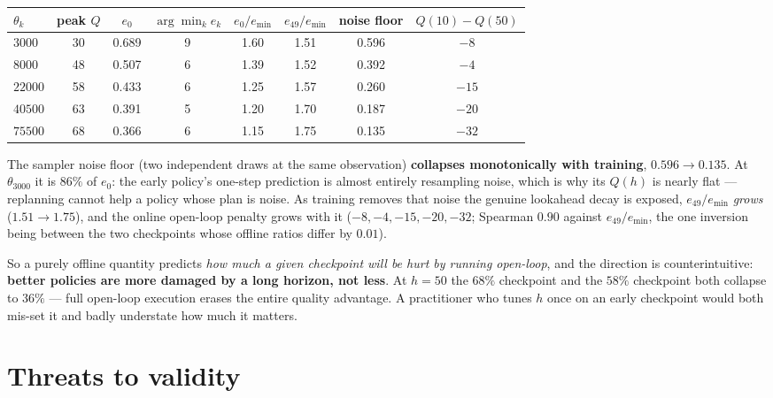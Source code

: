 \documentclass[11pt]{article}
\begin{document}
\begin{center}
\begin{tabular}{lccccccc}
\toprule
$\theta_k$ & peak $Q$ & $e_0$ & $\arg\min_k e_k$ & $e_0/e_{\min}$ & $e_{49}/e_{\min}$ & noise floor & $Q(10)-Q(50)$\\
\midrule
$3000$  & 30 & 0.689 & 9 & 1.60 & 1.51 & 0.596 & $-8$\\
$8000$  & 48 & 0.507 & 6 & 1.39 & 1.52 & 0.392 & $-4$\\
$22000$ & 58 & 0.433 & 6 & 1.25 & 1.57 & 0.260 & $-15$\\
$40500$ & 63 & 0.391 & 5 & 1.20 & 1.70 & 0.187 & $-20$\\
$75500$ & 68 & 0.366 & 6 & 1.15 & 1.75 & 0.135 & $-32$\\
\bottomrule
\end{tabular}
\end{center}

The sampler noise floor (two independent draws at the same observation) \textbf{collapses
monotonically with training}, $0.596\to0.135$. At $\theta_{3000}$ it is $86\%$ of $e_0$: the early
policy's one-step prediction is almost entirely resampling noise, which is why its $Q(h)$ is nearly
flat --- replanning cannot help a policy whose plan is noise. As training removes that noise the
genuine lookahead decay is exposed, $e_{49}/e_{\min}$ \emph{grows} ($1.51\to1.75$), and the online
open-loop penalty grows with it ($-8,-4,-15,-20,-32$; Spearman $0.90$ against $e_{49}/e_{\min}$, the
one inversion being between the two checkpoints whose offline ratios differ by $0.01$).

So a purely offline quantity predicts \emph{how much a given checkpoint will be hurt by running
open-loop}, and the direction is counterintuitive: \textbf{better policies are more damaged by a long
horizon, not less}. At $h=50$ the $68\%$ checkpoint and the $58\%$ checkpoint both collapse to
$36\%$ --- full open-loop execution erases the entire quality advantage. A practitioner who tunes
$h$ once on an early checkpoint would both mis-set it and badly understate how much it matters.

\section{Threats to validity}
\end{document}
